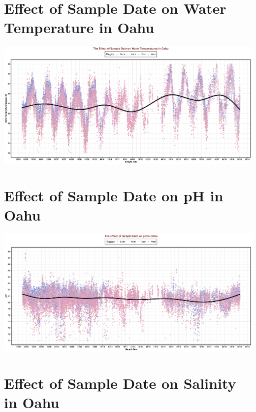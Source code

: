 \documentclass[12pt,]{article}
\begin{document}
\section{Effect of Sample Date on Water Temperature in
Oahu}\label{effect-of-sample-date-on-water-temperature-in-oahu}

\includegraphics{Garcia_ENV872_Project_files/figure-latex/Temp-1.pdf}

\section{Effect of Sample Date on pH in
Oahu}\label{effect-of-sample-date-on-ph-in-oahu}

\includegraphics{Garcia_ENV872_Project_files/figure-latex/pH-1.pdf}

\section{Effect of Sample Date on Salinity in
Oahu}\label{effect-of-sample-date-on-salinity-in-oahu}
\end{document}
